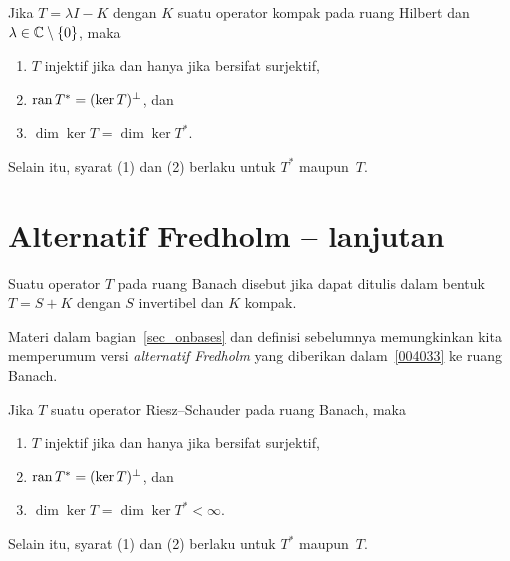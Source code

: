 \begin{prop}\label{004033} Jika $T = \lambda I - K$ dengan
$K$ suatu operator kompak pada ruang Hilbert dan $\lambda \in \mathbb{C}\setminus\{0\}$, maka
 \begin{enumerate}
  \item $T$ injektif jika dan hanya jika bersifat surjektif,
  \item $\operatorname{ran} T^* = (\ker T)^\perp$, dan
  \item $\dim\ker T = \dim \ker T^*$.
 \end{enumerate}
Selain itu, syarat (1) dan (2) berlaku untuk $T^*$ maupun~$T$.
\end{prop}


















\section{Alternatif Fredholm -- lanjutan}
\begin{defn}\label{004034} Suatu operator $T$ pada ruang Banach disebut
 jika dapat ditulis dalam bentuk $T = S + K$ dengan $S$
invertibel dan $K$ kompak.
\end{defn}

Materi dalam bagian~\ref{sec_onbases} dan definisi sebelumnya memungkinkan kita
memperumum versi \emph{alternatif Fredholm} yang diberikan dalam~\ref{004033} ke ruang
Banach.

\begin{prop}\label{0040343} Jika $T$ suatu operator Riesz--Schauder
pada ruang Banach, maka
 \begin{enumerate}
  \item $T$ injektif jika dan hanya jika bersifat surjektif,
  \item $\operatorname{ran} T^* = (\ker T)^\perp$, dan
  \item $\dim\ker T = \dim \ker T^* < \infty$.
 \end{enumerate}
Selain itu, syarat (1) dan (2) berlaku untuk $T^*$ maupun~$T$.
\end{prop}

